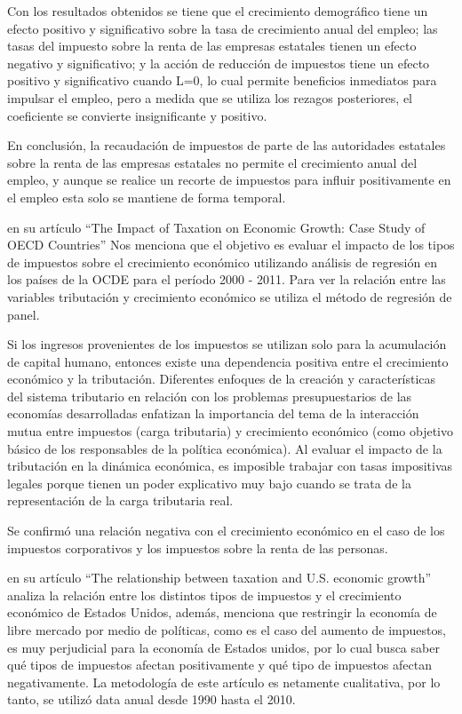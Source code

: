 \documentclass[
  letterpaper,
  DIV=11,
  numbers=noendperiod]{scrartcl}
\begin{document}
Con los resultados obtenidos se tiene que el crecimiento demográfico
tiene un efecto positivo y significativo sobre la tasa de crecimiento
anual del empleo; las tasas del impuesto sobre la renta de las empresas
estatales tienen un efecto negativo y significativo; y la acción de
reducción de impuestos tiene un efecto positivo y significativo cuando
L=0, lo cual permite beneficios inmediatos para impulsar el empleo, pero
a medida que se utiliza los rezagos posteriores, el coeficiente se
convierte insignificante y positivo.

En conclusión, la recaudación de impuestos de parte de las autoridades
estatales sobre la renta de las empresas estatales no permite el
crecimiento anual del empleo, y aunque se realice un recorte de
impuestos para influir positivamente en el empleo esta solo se mantiene
de forma temporal.

\textcite{macek_impact_2014} en su artículo ``The Impact of Taxation on
Economic Growth: Case Study of OECD Countries'' Nos menciona que el
objetivo es evaluar el impacto de los tipos de impuestos sobre el
crecimiento económico utilizando análisis de regresión en los países de
la OCDE para el período 2000 - 2011. Para ver la relación entre las
variables tributación y crecimiento económico se utiliza el método de
regresión de panel.

Si los ingresos provenientes de los impuestos se utilizan solo para la
acumulación de capital humano, entonces existe una dependencia positiva
entre el crecimiento económico y la tributación. Diferentes enfoques de
la creación y características del sistema tributario en relación con los
problemas presupuestarios de las economías desarrolladas enfatizan la
importancia del tema de la interacción mutua entre impuestos (carga
tributaria) y crecimiento económico (como objetivo básico de los
responsables de la política económica). Al evaluar el impacto de la
tributación en la dinámica económica, es imposible trabajar con tasas
impositivas legales porque tienen un poder explicativo muy bajo cuando
se trata de la representación de la carga tributaria real.

Se confirmó una relación negativa con el crecimiento económico en el
caso de los impuestos corporativos y los impuestos sobre la renta de las
personas.

\textcite{husak_relationship_2021} en su artículo ``The relationship
between taxation and U.S. economic growth'' analiza la relación entre
los distintos tipos de impuestos y el crecimiento económico de Estados
Unidos, además, menciona que restringir la economía de libre mercado por
medio de políticas, como es el caso del aumento de impuestos, es muy
perjudicial para la economía de Estados unidos, por lo cual busca saber
qué tipos de impuestos afectan positivamente y qué tipo de impuestos
afectan negativamente. La metodología de este artículo es netamente
cualitativa, por lo tanto, se utilizó data anual desde 1990 hasta el
2010.
\end{document}
